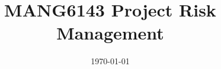 \documentclass{ecsarticle}     %
\begin{document}
\frontmatter
\title      {MANG6143 Project Risk Management}
\purpose  {}
\addresses  {\purname\\\coname\\\univname}
\date       {\today}
\subject    {Performance Uncertainty Management Processes - Overview and Appraisal}
\keywords   {}
\maketitle
\begin{abstract}
%

\end{abstract}



\mainmatter




\backmatter




\appendix
\end{document}
